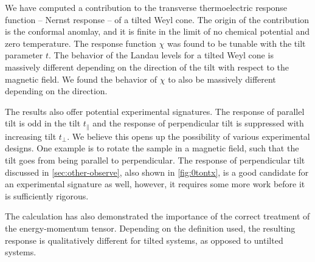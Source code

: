 We have computed a contribution to the transverse thermoelectric response function -- Nernst response -- of a tilted Weyl cone.
The origin of the contribution is the conformal anomlay, and it is finite in the limit of no chemical potential and zero temperature.
The response function \( \chi \) was found to be tunable with the tilt parameter \( t \).
The behavior of the Landau levels for a tilted Weyl cone is massively different depending on the direction of the tilt with respect to the magnetic field.
We found the behavior of \( \chi \) to also be massively different depending on the direction.

The results also offer potential experimental signatures.
The response of parallel tilt is odd in the tilt \( t_\parallel \) and the response of perpendicular tilt is suppressed with increasing tilt \( t_\perp \).
We believe this opens up the possibility of various experimental designs.
One example is to rotate the sample in a magnetic field, such that the tilt goes from being parallel to perpendicular.
The response of perpendicular tilt discussed in \cref{sec:other-observe}, also shown in \cref{fig:0tontx}, is a good candidate for an experimental signature as well, however, it requires some more work before it is sufficiently rigorous.


The calculation has also demonstrated the importance of the correct treatment of the energy-momentum tensor.
Depending on the definition used, the resulting response is qualitatively different for tilted systems, as opposed to untilted systems.

